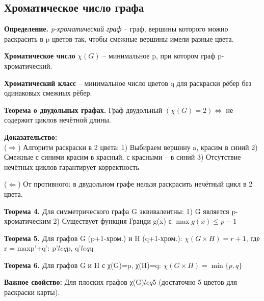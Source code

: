 \subsection{Хроматическое число графа}

\noindent\textbf{Определение.} \textit{p-хроматический граф} -- граф, вершины которого можно раскрасить в p цветов так, чтобы смежные вершины имели разные цвета.

\noindent\textbf{Хроматическое число} $\chi(G)$ -- минимальное p, при котором граф p-хроматический.

\noindent\textbf{Хроматический класс} -- минимальное число цветов q для раскраски рёбер без одинаковых смежных рёбер.

\noindent\textbf{Теорема о двудольных графах.} Граф двудольный $(χ(G)=2) \Longleftrightarrow$ не содержит циклов нечётной длины.

\noindent\textbf{Доказательство:}\\
($\Rightarrow$) Алгоритм раскраски в 2 цвета:
1) Выбираем вершину a, красим в синий
2) Смежные с синими красим в красный, с красными -- в синий
3) Отсутствие нечётных циклов гарантирует корректность
 
($\Leftarrow$) От противного: в двудольном графе нельзя раскрасить нечётный цикл в 2 цвета.

\noindent\textbf{Теорема 4.} Для симметрического графа G эквивалентны:
1) G является p-хроматическим
2) Существует функция Гранди g(x) с $\max g(x) \leq p-1$

\noindent\textbf{Теорема 5.} Для графов G (p+1-хром.) и H (q+1-хром.):
$\chi(G \times H) = r+1$, где r = max{p'+q': p'$leq$p, q'$leq$q}

\noindent\textbf{Теорема 6.} Для графов G и H с χ(G)=p, χ(H)=q:
$\chi(G \times H) = \min\{p,q\}$

\noindent\textbf{Важное свойство:} Для плоских графов χ(G)$leq$5 (достаточно 5 цветов для раскраски карты).